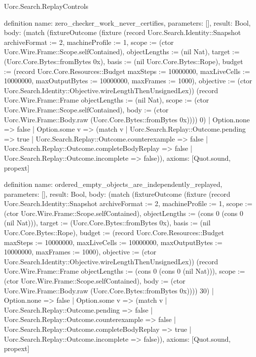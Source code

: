 \begin{lexlean}{Uorc.Search.ReplayControls}
\begin{semanticmodule}
definition{
  name: zero_checker_work_never_certifies,
  parameters: [],
  result: Bool,
  body: (match (fixtureOutcome (fixture (record Uorc.Search.Identity::Snapshot {archiveFormat := 2, machineProfile := 1, scope := (ctor Uorc.Wire.Frame::Scope.selfContained), objectLengths := (nil Nat), target := (Uorc.Core.Bytes::fromBytes 0x), basis := (nil Uorc.Core.Bytes::Rope), budget := (record Uorc.Core.Resources::Budget {maxSteps := 10000000, maxLiveCells := 10000000, maxOutputBytes := 10000000, maxFrames := 1000}), objective := (ctor Uorc.Search.Identity::Objective.wireLengthThenUnsignedLex)}) (record Uorc.Wire.Frame::Frame {objectLengths := (nil Nat), scope := (ctor Uorc.Wire.Frame::Scope.selfContained), body := (ctor Uorc.Wire.Frame::Body.raw (Uorc.Core.Bytes::fromBytes 0x))})) 0)
    | Option.none => false
    | Option.some v => (match v
      | Uorc.Search.Replay::Outcome.pending => true
      | Uorc.Search.Replay::Outcome.counterexample => false
      | Uorc.Search.Replay::Outcome.completeBodyReplay => false
      | Uorc.Search.Replay::Outcome.incomplete => false)),
  axioms: [Quot.sound, propext]
}

definition{
  name: ordered_empty_objects_are_independently_replayed,
  parameters: [],
  result: Bool,
  body: (match (fixtureOutcome (fixture (record Uorc.Search.Identity::Snapshot {archiveFormat := 2, machineProfile := 1, scope := (ctor Uorc.Wire.Frame::Scope.selfContained), objectLengths := (cons 0 (cons 0 (nil Nat))), target := (Uorc.Core.Bytes::fromBytes 0x), basis := (nil Uorc.Core.Bytes::Rope), budget := (record Uorc.Core.Resources::Budget {maxSteps := 10000000, maxLiveCells := 10000000, maxOutputBytes := 10000000, maxFrames := 1000}), objective := (ctor Uorc.Search.Identity::Objective.wireLengthThenUnsignedLex)}) (record Uorc.Wire.Frame::Frame {objectLengths := (cons 0 (cons 0 (nil Nat))), scope := (ctor Uorc.Wire.Frame::Scope.selfContained), body := (ctor Uorc.Wire.Frame::Body.raw (Uorc.Core.Bytes::fromBytes 0x))})) 30)
    | Option.none => false
    | Option.some v => (match v
      | Uorc.Search.Replay::Outcome.pending => false
      | Uorc.Search.Replay::Outcome.counterexample => false
      | Uorc.Search.Replay::Outcome.completeBodyReplay => true
      | Uorc.Search.Replay::Outcome.incomplete => false)),
  axioms: [Quot.sound, propext]
}


\end{semanticmodule}
\end{lexlean}
